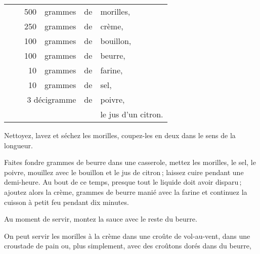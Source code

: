 \footnotesize
\begin{longtable}{rrrrrp{18em}}
  & \hspace{2em} & 500 & grammes & de & morilles,                                                         \\
  & \hspace{2em} & 250 & grammes & de & crème,                                                            \\
  & \hspace{2em} & 100 & grammes & de & bouillon,                                                         \\
  & \hspace{2em} & 100 & grammes & de & beurre,                                                           \\
  & \hspace{2em} &  10 & grammes & de & farine,                                                           \\
  & \hspace{2em} &  10 & grammes & de & sel,                                                              \\
  & \multicolumn{3}{r}{3 décigramme} & de & poivre,                                                       \\
  & \hspace{2em} &     &         &    & le jus d'un citron.                                               \\
\end{longtable}
\normalsize

Nettoyez, lavez et séchez les morilles, coupez-les en deux dans le sens de la
longueur.

Faites fondre {\mmm} grammes de beurre dans une casserole, mettez les
morilles, le sel, le poivre, mouillez avec le bouillon et le jus de citron ;
laissez cuire pendant une demi-heure. Au bout de ce temps, presque tout le
liquide doit avoir disparu ; ajoutez alors la crème, {\mmm} grammes de
beurre manié avec la farine et continuez la cuisson à petit feu pendant dix
minutes.

Au moment de servir, montez la sauce avec le reste du beurre.

\medskip

On peut servir les morilles à la crème dans une croûte de vol-au-vent, dans une
croustade de pain ou, plus simplement, avec des croûtons dorés dans du beurre,

